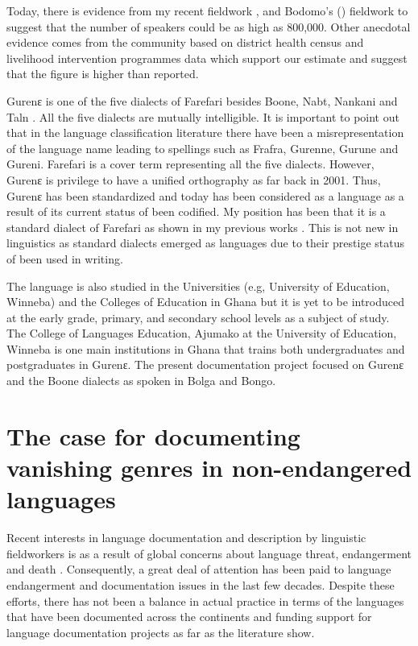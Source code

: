 \documentclass[output=paper,colorlinks,citecolor=brown]{langscibook}
\begin{document}
Today, there is evidence from my recent fieldwork \citep{Atintono2013, Atintono2020}, and Bodomo's (\citeyear{Bodomo2004, Bodomo2020}) fieldwork to suggest that the number of speakers could be as high as 800,000. Other anecdotal evidence comes from the community based on district health census and livelihood intervention programmes data which support our estimate and suggest that the figure is higher than reported. 

Gurenɛ is one of the five dialects of Farefari besides Boone, Nabt, Nankani and Taln \citep{Dakubu1995, Nsoh1997, Nsoh2011, Atintono2002, Atintono2004, Atintono2011, Atintono2013, Atintono2019}. All the five dialects are mutually intelligible. It is important to point out that in the language classification literature there have been a misrepresentation of the language name leading to spellings such as Frafra, Gurenne, Gurune and Gureni. Farefari is a cover term representing all the five dialects. However, Gurenɛ is privilege to have a unified orthography as far back in 2001. Thus, Gurenɛ has been standardized and today has been considered as a language as a result of its current status of been codified. My position has been that it is a standard dialect of Farefari as shown in my previous works \citep{Atintono2002, Atintono2004, Atintono2011, Atintono2013}. This is not new in linguistics as standard dialects emerged as languages due to their prestige status of been used in writing.

The language is also studied in the Universities (e.g, University of Education, Winneba) and the Colleges of Education in Ghana but it is yet to be introduced at the early grade, primary, and secondary school levels as a subject of study. The College of Languages Education, Ajumako at the University of Education, Winneba is one main institutions in Ghana that trains both undergraduates and postgraduates in Gurenɛ. The present documentation project focused on Gurenɛ and the Boone dialects as spoken in Bolga and Bongo.

\section{The case for documenting vanishing genres in non-endangered languages }
Recent interests in language documentation and description by linguistic fieldworkers is as a result of global concerns about language threat, endangerment and death \citep{HaleEtAl1992, Himmelmann1998, HimmelmannEtAl2006, GrenobleWhaley1996, Crystal2000, Crystal2003, Woodbury2003, Austin2003, Austin2006, GippertEtAl2006, Bowern2015, ChelliahWillem2010, EssegbeyEtAl2015}. Consequently, a great deal of attention has been paid to language endangerment and documentation issues in the last few decades. Despite these efforts, there has not been a balance in actual practice in terms of the languages that have been documented across the continents and funding support for language documentation projects as far as the literature show. 
\end{document}
